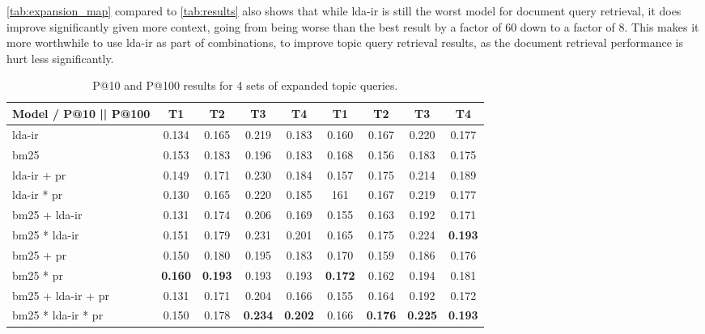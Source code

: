 \autoref{tab:expansion_map} compared to \autoref{tab:results} also shows that while \gls{lda}-\gls{ir} is still the worst model for document query retrieval, it does improve significantly given more context, going from being worse than the best result by a factor of 60 down to a factor of 8.
This makes it more worthwhile to use \gls{lda}-\gls{ir} as part of combinations, to improve topic query retrieval results, as the document retrieval performance is hurt less significantly.  

\begin{table*}[h]
	\centering
	\caption{P@10 and P@100 results for 4 sets of expanded topic queries.}
	\begin{tabular}{l|c|c|c|c||c|c|c|c}
		Model / P@10 || P@100 & T1 & T2 & T3 & T4 & T1 & T2 & T3 & T4\\
		\midrule
		\gls{lda}-\gls{ir} & 0.134 & 0.165 & 0.219 & 0.183 & 0.160 & 0.167 & 0.220 & 0.177 \\
		\gls{bm25} & 0.153 & 0.183 & 0.196 & 0.183 & 0.168 & 0.156 & 0.183 & 0.175 \\ 
		\gls{lda}-\gls{ir} + \gls{pr} & 0.149 & 0.171 & 0.230 & 0.184 & 0.157 & 0.175 & 0.214 & 0.189 \\
		\gls{lda}-\gls{ir} * \gls{pr} & 0.130 & 0.165 & 0.220 & 0.185 & 161 & 0.167 & 0.219 & 0.177 \\
		\gls{bm25} + \gls{lda}-\gls{ir} & 0.131 & 0.174 & 0.206 & 0.169 & 0.155 & 0.163 & 0.192 & 0.171 \\
		\gls{bm25} * \gls{lda}-\gls{ir} & 0.151 & 0.179 & 0.231 & 0.201 & 0.165 & 0.175 & 0.224 & \textbf{0.193} \\
		\gls{bm25} + \gls{pr} & 0.150 & 0.180 & 0.195 & 0.183 & 0.170 & 0.159 & 0.186 & 0.176 \\
		\gls{bm25} * \gls{pr} & \textbf{0.160} & \textbf{0.193} & 0.193 & 0.193 & \textbf{0.172} & 0.162 & 0.194 & 0.181 \\
		\gls{bm25} + \gls{lda}-\gls{ir} + \gls{pr} & 0.131 & 0.171 & 0.204 & 0.166 & 0.155 & 0.164 & 0.192 & 0.172 \\
		\gls{bm25} * \gls{lda}-\gls{ir} * \gls{pr} & 0.150 & 0.178 & \textbf{0.234} & \textbf{0.202} & 0.166 & \textbf{0.176} & \textbf{0.225} & \textbf{0.193} \\
	\end{tabular}
	\label{tab:expansion_results}
\end{table*}

